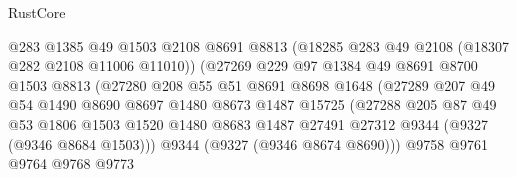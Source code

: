 \begin{lexlean}{RustCore}
\begin{coremodule}
                                  @283
                                  @1385
                                  @49
                                  @1503
                                  @2108
                                  @8691
                                  @8813
                                  (@18285 @283 @49 @2108 (@18307 @282 @2108 @11006 @11010))
                                  (@27269
                                    @229
                                    @97
                                    @1384
                                    @49
                                    @8691
                                    @8700
                                    @1503
                                    @8813
                                    (@27280
                                      @208
                                      @55
                                      @51
                                      @8691
                                      @8698
                                      @1648
                                      (@27289
                                        @207
                                        @49
                                        @54
                                        @1490
                                        @8690
                                        @8697
                                        @1480
                                        @8673
                                        @1487
                                        @15725
                                        (@27288
                                          @205
                                          @87
                                          @49
                                          @53
                                          @1806
                                          @1503
                                          @1520
                                          @1480
                                          @8683
                                          @1487
                                          @27491
                                          @27312
                                          @9344
                                          (@9327 (@9346 @8684 @1503)))
                                        @9344
                                        (@9327 (@9346 @8674 @8690)))
                                      @9758
                                      @9761
                                      @9764
                                      @9768
                                      @9773

\end{coremodule}
\end{lexlean}
